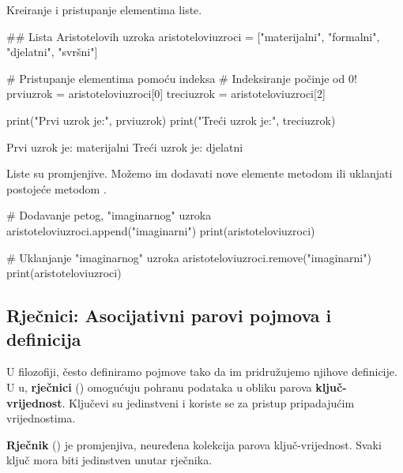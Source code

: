 \begin{primjerokvir}
    Kreiranje i pristupanje elementima liste.
    \begin{pythoncode}

## Lista Aristotelovih uzroka
aristoteloviuzroci = ["materijalni", "formalni", "djelatni", "svršni"]

# Pristupanje elementima pomoću indeksa
# Indeksiranje počinje od 0!
prviuzrok = aristoteloviuzroci[0]
treciuzrok = aristoteloviuzroci[2]

print("Prvi uzrok je:", prviuzrok)
print("Treći uzrok je:", treciuzrok)
    \end{pythoncode}
    \begin{codeoutput}
Prvi uzrok je: materijalni
Treći uzrok je: djelatni
    \end{codeoutput}

    Liste su promjenjive. Možemo im dodavati nove elemente metodom  ili uklanjati postojeće metodom .

    \begin{pythoncode}
# Dodavanje petog, "imaginarnog" uzroka
aristoteloviuzroci.append("imaginarni")
print(aristoteloviuzroci)

# Uklanjanje "imaginarnog" uzroka
aristoteloviuzroci.remove("imaginarni")
print(aristoteloviuzroci)
    \end{pythoncode}
    \begin{codeoutput}
    \end{codeoutput}
\end{primjerokvir}

\subsection{Rječnici: Asocijativni parovi pojmova i definicija}

U filozofiji, često definiramo pojmove tako da im pridružujemo njihove definicije. U u, \textbf{rječnici} () omogućuju pohranu podataka u obliku parova \textbf{ključ-vrijednost}. Ključevi su jedinstveni i koriste se za pristup pripadajućim vrijednostima.

\begin{definicijaokvir}
    \textbf{Rječnik} () je promjenjiva, neuređena kolekcija parova ključ-vrijednost. Svaki ključ mora biti jedinstven unutar rječnika.
\end{definicijaokvir}

